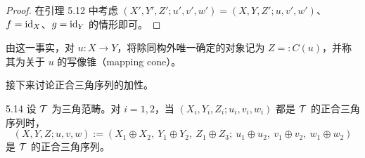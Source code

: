 \begin{proof}
在引理 5.12 中考虑 $(X',Y',Z';u',v',w')=(X,Y,Z';u,v',w')$、$f=\mathrm{id}_X$、$g=\mathrm{id}_Y$ 的情形即可。
\end{proof}

由这一事实，对 $u\colon X\to Y$，将除同构外唯一确定的对象记为 $Z =: C(u)$，并称其为关于 $u$ 的写像锥（mapping cone）。


接下来讨论正合三角序列的加性。

\begin{lemma}{5.14}
设 $\mathcal{T}$ 为三角范畴。对 $i=1,2$，当 $(X_i,Y_i,Z_i;u_i,v_i,w_i)$ 都是 $\mathcal{T}$ 的正合三角序列时，
\[
(X,Y,Z;u,v,w) := (X_1\oplus X_2,\ Y_1\oplus Y_2,\ Z_1\oplus Z_3;\ u_1\oplus u_2,\ v_1\oplus v_2,\ w_1\oplus w_2)
\]
是 $\mathcal{T}$ 的正合三角序列。
\end{lemma}


